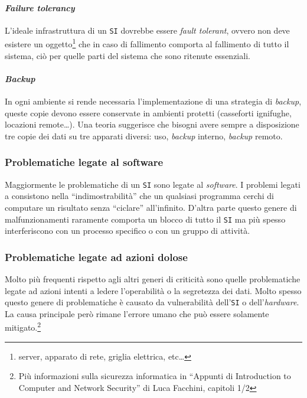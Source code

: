         \paragraph{\textit{Failure tolerancy}} L'ideale infrastruttura di un \texttt{SI} dovrebbe essere \textit{fault tolerant}, ovvero non deve esistere un oggetto\footnote{server, apparato di rete, griglia elettrica, etc\dots } che in caso di fallimento comporta al fallimento di tutto il sistema, ciò per quelle parti del sistema che sono ritenute essenziali.
        \paragraph{\textit{Backup}} In ogni ambiente si rende necessaria l'implementazione di una strategia di \textit{backup}, queste copie devono essere conservate in ambienti protetti (casseforti ignifughe, locazioni remote\dots). Una teoria suggerisce che bisogni avere sempre a disposizione tre copie dei dati su tre apparati diversi: uso, \textit{backup} interno, \textit{backup} remoto.
    \subsubsection{Problematiche legate al software}
        Maggiormente le problematiche di un \texttt{SI} sono legate al \textit{software}. I problemi legati a consistono nella ``indimostrabilità'' che un qualsiasi programma  cerchi di computare un risultato senza ``ciclare'' all'infinito. D'altra parte questo genere di malfunzionamenti raramente comporta un blocco di tutto il \texttt{SI} ma più spesso interferiscono con un processo specifico o con un gruppo di attività.
    \subsubsection{Problematiche legate ad azioni dolose}
        Molto più frequenti rispetto agli altri generi di criticità sono quelle problematiche legate ad azioni intenti a ledere l'operabilità o la segretezza dei dati. Molto spesso questo genere di problematiche è causato da vulnerabilità dell'\texttt{SI} o dell'\textit{hardware}. La causa principale però rimane l'errore umano che può essere solamente mitigato.\footnote{Più informazioni sulla sicurezza informatica in ``Appunti di Introduction to Computer and Network Security'' di Luca Facchini, capitoli 1/2}